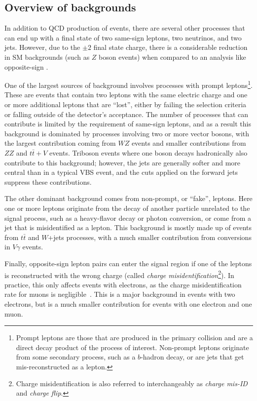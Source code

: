 \subsection{Overview of backgrounds}\label{ssww13tev:background_overview}
In addition to QCD production of \ssww events, there are several other processes that can end up with a final state of two same-sign leptons, two neutrinos, and two jets.
However, due to the $\pm 2$ final state charge, there is a considerable reduction in SM backgrounds (such as $Z$ boson events) when compared to an analysis like opposite-sign \oswwjj.

One of the largest sources of background involves processes with prompt leptons\footnote{Prompt leptons are those that are produced in the primary collision and are a direct decay product of the process of interest.  Non-prompt leptons originate from some secondary process, such as a $b$-hadron decay, or are jets that get mis-reconstructed as a lepton.}.
These are events that contain two leptons with the same electric charge and one or more additional leptons that are ``lost'', either by failing the selection criteria or falling outside of the detector's acceptance.
The number of processes that can contribute is limited by the requirement of same-sign leptons, and as a result this background is dominated by processes involving two or more vector bosons, with the largest contribution coming from $WZ$ events and smaller contributions from $ZZ$ and $t\bar{t}+V$ events.
Triboson events where one boson decays hadronically also contribute to this background; however, the jets are generally softer and more central than in a typical VBS event, and the cuts applied on the forward jets suppress these contributions.

The other dominant background comes from non-prompt, or ``fake'', leptons.
Here one or more leptons originate from the decay of another particle unrelated to the signal process, such as a heavy-flavor decay or photon conversion, or come from a jet that is misidentified as a lepton.
This background is mostly made up of events from $t\bar{t}$ and $W$+jets processes, with a much smaller contribution from conversions in $V\gamma$ events. %

Finally, opposite-sign lepton pairs can enter the signal region if one of the leptons is reconstructed with the wrong charge (called \emph{charge misidentification}\footnote{Charge misidentification is also referred to interchangeably as \emph{charge mis-ID} and \emph{charge flip}.}).
In practice, this only affects events with electrons, as the charge misidentification rate for muons is negligible~\cite{2013.muon-flip}.
This is a major background in events with two electrons, but is a much smaller contribution for events with one electron and one muon.

%
